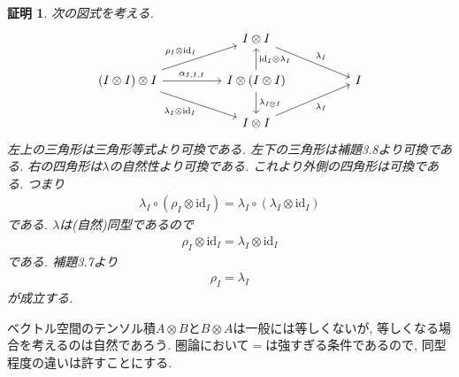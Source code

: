 \documentclass[a4paper,12pt]{ltjsarticle}
\theoremstyle{break}
\newtheorem*{prf}{証明}
\newcommand{\id}{\mathrm{id}}
\newcommand{\ci}{\circ}
\newcommand{\al}{\alpha}
\newcommand{\la}{\lambda}
\newcommand{\ot}{\otimes}
\numberwithin{equation}{section}
\begin{document}
\begin{prf}
  次の図式を考える. 
  \[\begin{tikzcd}
    && {I \ot I} \\
    {(I \ot I) \ot I} && {I \ot (I \ot I)} && I \\
    && {I \ot I}
    \arrow["{\rho_I \ot \id_I}", from=2-1, to=1-3]
    \arrow["{\al_{I,I,I}}", from=2-1, to=2-3]
    \arrow["{\id_I \ot \la_I}"', from=2-3, to=1-3]
    \arrow["{\la_I}", from=1-3, to=2-5]
    \arrow["{\la_I \ot \id_I}"', from=2-1, to=3-3]
    \arrow["{\la_I}"', from=3-3, to=2-5]
    \arrow["{\la_{I \ot I}}", from=2-3, to=3-3]
  \end{tikzcd}\]
  左上の三角形は三角形等式より可換である. 
  左下の三角形は補題3.8より可換である. 
  右の四角形は$\la$の自然性より可換である. 
  これより外側の四角形は可換である. 
  つまり
  \begin{align*}
    \la_I \ci (\rho_I \ot \id_I)=\la_I \ci (\la_I \ot \id_I)
  \end{align*}
  である. 
  $\la$は(自然)同型であるので
  \begin{align*}
    \rho_I \ot \id_I=\la_I \ot \id_I
  \end{align*}
  である. 
  補題3.7より
  \begin{align*}
    \rho_I=\la_I
  \end{align*}
  が成立する. 
\end{prf}

ベクトル空間のテンソル積$A \ot B$と$B \ot A$は一般には等しくないが, 等しくなる場合を考えるのは自然であろう. 
圏論において$=$は強すぎる条件であるので, 同型程度の違いは許すことにする. 
\end{document}
